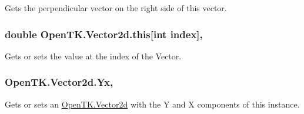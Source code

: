 Gets the perpendicular vector on the right side of this vector. 

\hypertarget{struct_open_t_k_1_1_vector2d_afb55e4bd5f5fe24a0a7fe0f899bbe876}{
\subsubsection[{this[int index]}]{\setlength{\rightskip}{0pt plus 5cm}double Open\-T\-K.\-Vector2d.\-this\mbox{[}int index\mbox{]}\hspace{0.3cm}{\ttfamily [get]}, {\ttfamily [set]}}}\label{struct_open_t_k_1_1_vector2d_afb55e4bd5f5fe24a0a7fe0f899bbe876}


Gets or sets the value at the index of the Vector. 

\hypertarget{struct_open_t_k_1_1_vector2d_aec31e1a880019cab41c29650f0facab9}{
\subsubsection[{Yx}]{ Open\-T\-K.\-Vector2d.\-Yx\hspace{0.3cm}{\ttfamily [get]}, {\ttfamily [set]}}}\label{struct_open_t_k_1_1_vector2d_aec31e1a880019cab41c29650f0facab9}


Gets or sets an \hyperlink{struct_open_t_k_1_1_vector2d}{Open\-T\-K.\-Vector2d} with the Y and X components of this instance. 

